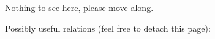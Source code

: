 \documentclass[letterpaper,addpoints,answers]{exam}
\begin{document}
 \pagebreak

 {\small Nothing to see here, please move along.} \\

 \pagebreak
 
 {\Large Possibly useful relations (feel free to detach this page):}
  
 
\end{document}
